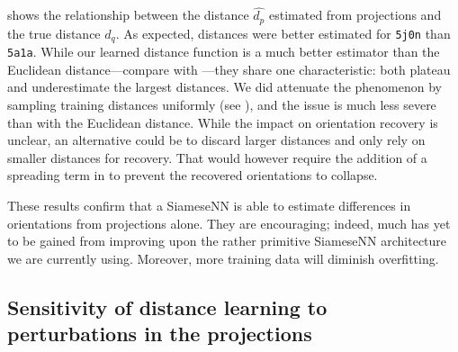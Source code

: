  shows the relationship between the distance $\widehat{d_p}$ estimated from projections and the true distance $d_q$.
As expected, distances were better estimated for \texttt{5j0n} than \texttt{5a1a}.
While our learned distance function is a much better estimator than the Euclidean distance---compare  with ---they share one characteristic: both plateau and underestimate the largest distances.
We did attenuate the phenomenon by sampling training distances uniformly (see ), and the issue is much less severe than with the Euclidean distance.
While the impact on orientation recovery is unclear, an alternative could be to discard larger distances and only rely on smaller distances for recovery.
That would however require the addition of a spreading term in  to prevent the recovered orientations to collapse.

These results confirm that a SiameseNN is able to estimate differences in orientations from projections alone.
They are encouraging; indeed, much has yet to be gained from improving upon the rather primitive SiameseNN architecture we are currently using.
Moreover, more training data will diminish overfitting.


\subsection{Sensitivity of distance learning to perturbations in the projections}\label{sec:results:distance-estimation:sensitivity}


